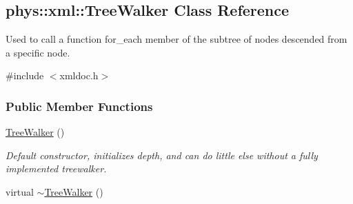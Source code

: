 \hypertarget{classphys_1_1xml_1_1TreeWalker}{
\subsection{phys::xml::TreeWalker Class Reference}
\label{d5/d8d/classphys_1_1xml_1_1TreeWalker}
}


Used to call a function for\_\-each member of the subtree of nodes descended from a specific node.  




{\ttfamily \#include $<$xmldoc.h$>$}

\subsubsection*{Public Member Functions}
\begin{DoxyCompactItemize}
\item 
\hypertarget{classphys_1_1xml_1_1TreeWalker_a5b4e97d7a0b433770431f8ebd8fc6489}{
\hyperlink{classphys_1_1xml_1_1TreeWalker_a5b4e97d7a0b433770431f8ebd8fc6489}{TreeWalker} ()}
\label{d5/d8d/classphys_1_1xml_1_1TreeWalker_a5b4e97d7a0b433770431f8ebd8fc6489}

\begin{DoxyCompactList}\small\item\em Default constructor, initializes depth, and can do little else without a fully implemented treewalker. \item\end{DoxyCompactList}\item 
\hypertarget{classphys_1_1xml_1_1TreeWalker_a84d0c68cf364a81e29f0cc321098ae28}{
virtual \hyperlink{classphys_1_1xml_1_1TreeWalker_a84d0c68cf364a81e29f0cc321098ae28}{$\sim$TreeWalker} ()}
\label{d5/d8d/classphys_1_1xml_1_1TreeWalker_a84d0c68cf364a81e29f0cc321098ae28}


\end{DoxyCompactItemize}
